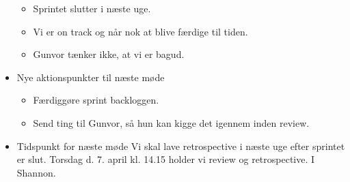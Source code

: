 \documentclass{article}
\begin{document}
\begin{itemize}
\begin{itemize}
			\item Sprintet slutter i næste uge. 
			\item Vi er on track og når nok at blive færdige til tiden. 
			\item Gunvor tænker ikke, at vi er bagud. 
		\end{itemize}
		\item Nye aktionspunkter til næste møde
		\begin{itemize}
			\item Færdiggøre sprint backloggen. 
			\item Send ting til Gunvor, så hun kan kigge det igennem inden review. 
		\end{itemize}
		\item Tidspunkt for næste møde
		\subitem Vi skal lave retrospective i næste uge efter sprintet er slut.
		\subitem Torsdag d. 7. april kl. 14.15 holder vi review og retrospective. 
		\subitem I Shannon. 
	\end{itemize}
\end{document}
